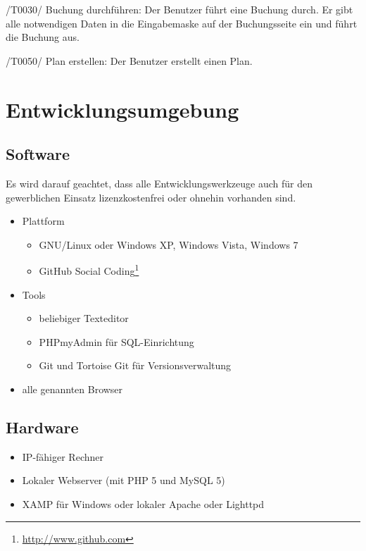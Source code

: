 \documentclass[a4paper,oneside]{scrreprt}
\begin{document}
/T0030/ Buchung durchführen: 
Der Benutzer führt eine Buchung durch. Er gibt alle notwendigen Daten in die Eingabemaske auf der Buchungsseite ein und führt die Buchung aus.

/T0050/ Plan erstellen: 
Der Benutzer erstellt einen Plan.



\chapter{Entwicklungsumgebung}

\section{Software}

Es wird darauf geachtet, dass alle Entwicklungswerkzeuge auch für den gewerblichen Einsatz lizenzkostenfrei oder ohnehin vorhanden sind.

\begin{itemize}
\item Plattform
    \begin{itemize}
    \item GNU/Linux oder Windows XP, Windows Vista, Windows 7
    \item GitHub Social Coding\footnote{\url{http://www.github.com}}
    \end{itemize}

\item Tools
    \begin{itemize}
    \item beliebiger Texteditor
    \item PHPmyAdmin für SQL-Einrichtung
    \item Git und Tortoise Git für Versionsverwaltung
    \end{itemize}

\item alle genannten Browser
\end{itemize}

\section{Hardware}

\begin{itemize}
\item IP-fähiger Rechner
\item Lokaler Webserver (mit PHP 5 und MySQL 5)
\item XAMP für Windows oder lokaler Apache oder Lighttpd
\end{itemize}
\end{document}
